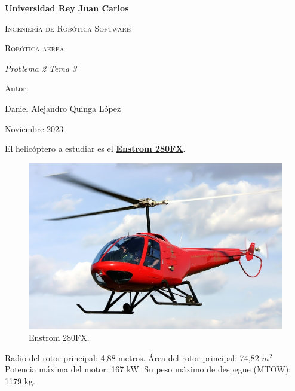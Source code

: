 \documentclass{article}
\begin{document}
    \begin{titlepage}
        \centering
        {\bfseries\LARGE Universidad Rey Juan Carlos\par}
        \vspace{1cm}
        {\scshape\Large Ingenier\'ia de Rob\'otica Software \par}
        \vspace{3cm}
        {\scshape\Huge Rob\'otica aerea \par}
        \vspace{3cm}
        {\itshape\Large Problema 2 Tema 3 \par}
        \vfill
        {\Large Autor: \par}
        {\Large Daniel Alejandro Quinga L\'opez \par}
        \vfill
        {\Large Noviembre 2023 \par}
    \end{titlepage}

    \newpage

    El helicóptero a estudiar es el \href{http://www.enstromhelicopter.com/wp-content/uploads/2012/03/enstrom-280fx-specifications.pdf}{\textbf{Enstrom 280FX}}.
    \begin{figure}[h]
        \centerline{\hspace{0cm}\includegraphics[width=0.66\columnwidth]{Enstrom_280FX_Shark_Geelong_Creek.jpg}}
        \caption{Enstrom 280FX.}\label{fig:figura_1}
    \end{figure}


    Radio del rotor principal: 4,88 metros.
    \newline
    Área del rotor principal: 74,82 $m^2$
    \newline
    Potencia máxima del motor: 167 kW.
    \newline
    Su peso máximo de despegue (MTOW): 1179 kg.
    \newline
\end{document}
